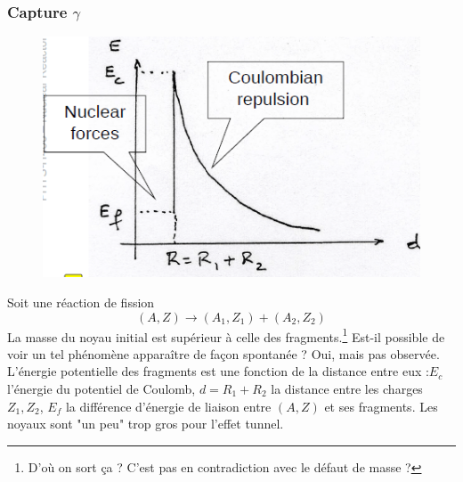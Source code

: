 \subsubsection{Capture $\gamma$}
	\begin{figure}
	\includegraphics[scale=0.475]{ch1/image10.png}
	\end{figure}
Soit une réaction de fission
\begin{equation}
(A,Z) \to (A_1,Z_1)+(A_2,Z_2)
\end{equation}
La masse du noyau initial est supérieur à celle des fragments.\footnote{D'où on sort ça ? C'est pas en contradiction
avec le défaut de masse ?} Est-il possible de voir un tel 
phénomène apparaître de façon spontanée ? Oui, mais pas observée. L'énergie potentielle des 
fragments est une fonction de la distance entre eux :$E_c$ l'énergie du potentiel de Coulomb, $d
=R_1+R_2$ la distance entre les charges $Z_1,Z_2$, $E_f$ la différence d'énergie de liaison entre 
$(A,Z)$ et ses fragments. Les noyaux sont "un peu" trop gros pour l'effet tunnel. \\

